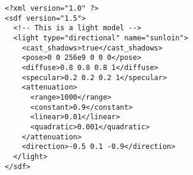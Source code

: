 \documentclass{article}
\begin{document}
\begin{lstlisting}
<?xml version="1.0" ?>
<sdf version="1.5">
  <!-- This is a light model -->
  <light type="directional" name="sunloin">
    <cast_shadows>true</cast_shadows>
    <pose>0 0 256e9 0 0 0</pose>
    <diffuse>0.8 0.8 0.8 1</diffuse>
    <specular>0.2 0.2 0.2 1</specular>
    <attenuation>
      <range>1000</range>
      <constant>0.9</constant>
      <linear>0.01</linear>
      <quadratic>0.001</quadratic>
    </attenuation>
    <direction>-0.5 0.1 -0.9</direction>
  </light>
</sdf>
\end{lstlisting}
\end{document}
